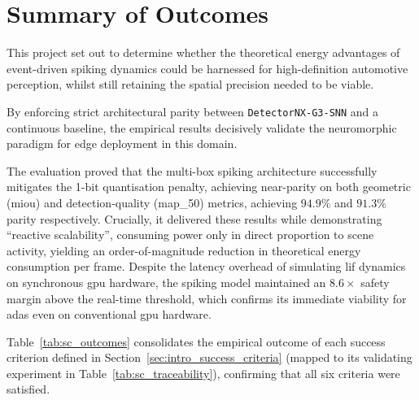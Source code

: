 \section{Summary of Outcomes}
\label{sec:summary_outcomes}

This project set out to determine whether the theoretical energy advantages of event-driven spiking dynamics could be harnessed for high-definition automotive perception,
whilst still retaining the spatial precision needed to be viable.

By enforcing strict architectural parity between \texttt{DetectorNX-G3-SNN} and a continuous baseline,
the empirical results decisively validate the neuromorphic paradigm for edge deployment in this domain.

The evaluation proved that the multi-box spiking architecture successfully mitigates the 1-bit
quantisation penalty, achieving near-parity on both geometric (\gls{miou}) and detection-quality (\gls{map_50}) metrics,
achieving $94.9\%$ and $91.3\%$ parity respectively.
Crucially, it delivered these results while demonstrating ``reactive scalability'', consuming
power only in direct proportion to scene activity, yielding an order-of-magnitude reduction in
theoretical energy consumption per frame. 
Despite the latency overhead of simulating \gls{lif} dynamics on synchronous \gls{gpu} hardware,
the spiking model maintained an $8.6\times$ safety margin above the real-time threshold, 
which confirms its immediate viability for \gls{adas} even on conventional \gls{gpu} hardware.

Table~\ref{tab:sc_outcomes} consolidates the empirical outcome of each success criterion defined
in Section~\ref{sec:intro_success_criteria} (mapped to its validating experiment in
Table~\ref{tab:sc_traceability}), confirming that all six criteria were satisfied.

